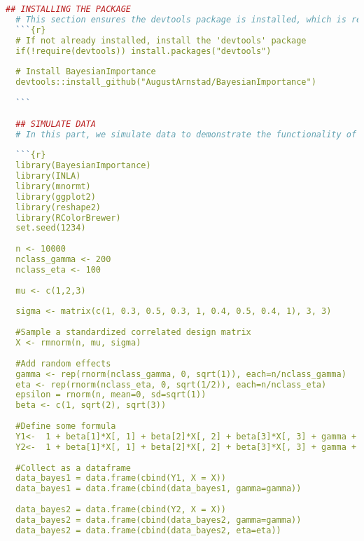 \begin{lstlisting}[language=R, caption=Usage of the Bayesian Importance package with plots and examples.]
  ## INSTALLING THE PACKAGE
  # This section ensures the devtools package is installed, which is required for installing packages from GitHub. We then install the BayesianImportance package directly from GitHub using devtools::install_github(). In the package under the Hello.R file, all functions are defined with corresponding documentation.
  ```{r}
  # If not already installed, install the 'devtools' package
  if(!require(devtools)) install.packages("devtools")
  
  # Install BayesianImportance
  devtools::install_github("AugustArnstad/BayesianImportance")
  
  ```
  
  ## SIMULATE DATA
  # In this part, we simulate data to demonstrate the functionality of the BayesianImportance package. We generate random variables with different correlation structures, random effects, and an error term. The data is then structured into data frames for further analysis. If you have a suitable dataset you can use this instead.
  
  ```{r}
  library(BayesianImportance)
  library(INLA)
  library(mnormt)
  library(ggplot2)
  library(reshape2)
  library(RColorBrewer)
  set.seed(1234)
  
  n <- 10000
  nclass_gamma <- 200
  nclass_eta <- 100
  
  mu <- c(1,2,3)
  
  sigma <- matrix(c(1, 0.3, 0.5, 0.3, 1, 0.4, 0.5, 0.4, 1), 3, 3)
  
  #Sample a standardized correlated design matrix
  X <- rmnorm(n, mu, sigma)
  
  #Add random effects
  gamma <- rep(rnorm(nclass_gamma, 0, sqrt(1)), each=n/nclass_gamma)
  eta <- rep(rnorm(nclass_eta, 0, sqrt(1/2)), each=n/nclass_eta)
  epsilon = rnorm(n, mean=0, sd=sqrt(1))
  beta <- c(1, sqrt(2), sqrt(3))
  
  #Define some formula
  Y1<-  1 + beta[1]*X[, 1] + beta[2]*X[, 2] + beta[3]*X[, 3] + gamma + epsilon # + eta
  Y2<-  1 + beta[1]*X[, 1] + beta[2]*X[, 2] + beta[3]*X[, 3] + gamma + eta + epsilon
  
  #Collect as a dataframe
  data_bayes1 = data.frame(cbind(Y1, X = X))
  data_bayes1 = data.frame(cbind(data_bayes1, gamma=gamma)) 
  
  data_bayes2 = data.frame(cbind(Y2, X = X))
  data_bayes2 = data.frame(cbind(data_bayes2, gamma=gamma)) 
  data_bayes2 = data.frame(cbind(data_bayes2, eta=eta))
  

\end{lstlisting}
